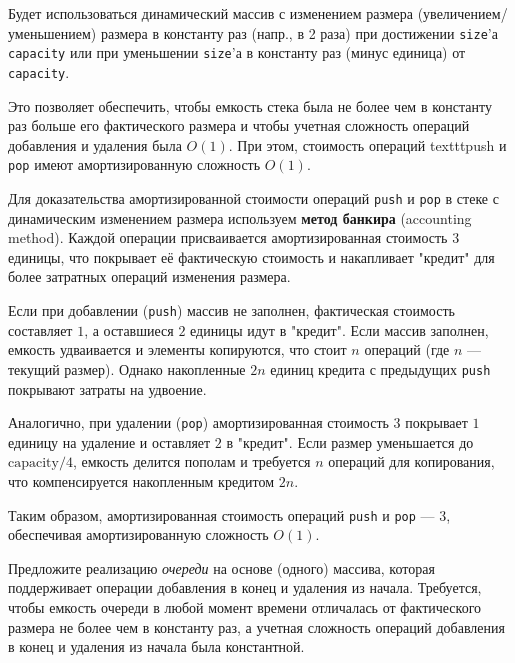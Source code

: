 \documentclass[11pt]{article}
\begin{document}
\begin{solution}
	Будет использоваться динамический массив с изменением размера (увеличением/уменьшением) размера в константу раз (напр., в 2 раза) при достижении \texttt{size}'а \texttt{capacity} или при уменьшении \texttt{size}'а в константу раз (минус единица) от \texttt{capacity}.

	Это позволяет обеспечить, чтобы емкость стека была не более чем в константу раз больше его фактического размера и чтобы учетная сложность операций добавления и удаления была $O(1)$. При этом, стоимость операций texttt{push} и \texttt{pop} имеют амортизированную сложность $O(1)$.

	Для доказательства амортизированной стоимости операций \texttt{push} и \texttt{pop} в стеке с динамическим изменением размера используем \textbf{метод банкира} (accounting method). Каждой операции присваивается амортизированная стоимость \(3\) единицы, что покрывает её фактическую стоимость и накапливает "кредит" для более затратных операций изменения размера.

	Если при добавлении (\texttt{push}) массив не заполнен, фактическая стоимость составляет \(1\), а оставшиеся \(2\) единицы идут в "кредит". Если массив заполнен, емкость удваивается и элементы копируются, что стоит \(n\) операций (где \(n\) — текущий размер). Однако накопленные \(2n\) единиц кредита с предыдущих \texttt{push} покрывают затраты на удвоение.

	Аналогично, при удалении (\texttt{pop}) амортизированная стоимость \(3\) покрывает \(1\) единицу на удаление и оставляет \(2\) в "кредит". Если размер уменьшается до \(\text{capacity}/4\), емкость делится пополам и требуется \(n\) операций для копирования, что компенсируется накопленным кредитом \(2n\).

	Таким образом, амортизированная стоимость операций \texttt{push} и \texttt{pop} — \(3\), обеспечивая амортизированную сложность \(O(1)\).

\end{solution}
\begin{problem}{20}
Предложите реализацию \emph{очереди} на основе (одного) массива, которая поддерживает операции добавления в конец и удаления из начала. Требуется, чтобы емкость очереди в любой момент времени отличалась от фактического размера не более чем в константу раз, а учетная сложность операций добавления в конец и удаления из начала была константной.
\end{problem}
\end{document}
